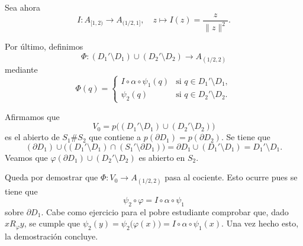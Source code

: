 {    Sea ahora 
    \[
    I : A_{[1, 2)} \to A_{(1/2, 1]},\quad z \mapsto I(z) = \frac{z}{\|z\|^2}.
    \]

    Por último, definimos 
    \[
    \Phi : (D_1' \setminus D_1) \cup (D_2' \setminus D_2) \to A_{(1/2, 2)}
    \]
    mediante
    \[
    \Phi(q) = 
    \begin{cases}
    I \circ \alpha \circ \psi_1(q) & \text{si } q \in D_1' \setminus D_1, \\
    \psi_2(q) & \text{si } q \in D_2' \setminus D_2.
    \end{cases}
    \]

    Afirmamos que 
    \[
    V_0 = p\big((D_1' \setminus D_1) \cup (D_2' \setminus D_2)\big)
    \]
    es el abierto de \(S_1 \# S_2\) que contiene a \(p(\partial D_1) = p(\partial D_2)\). Se tiene que 
    \[
    (\partial D_1)\cup \big((D_1' \setminus D_1) \cap (S_1' \setminus \partial D_1)\big) = \partial D_1 \cup (D_1' \setminus D_1) = D_1'\setminus D_1.
    \]
    Veamos que \(\varphi(\partial D_1) \cup (D_2'\setminus D_2) \) es abierto en \(S_2\).

    Queda por demostrar que 
    \(\Phi : V_0 \to A_{(1/2, 2)}\) pasa al cociente. Esto ocurre pues se tiene que 
    \[
    \psi_2 \circ \varphi = I \circ \alpha \circ \psi_1
    \]
    sobre \(\partial D_1\). Cabe como ejercicio para el pobre estudiante comprobar que, dado \(x R_\varphi y\), se cumple que \(\psi_2(y) = \psi_2\big(\varphi(x)\big) = I \circ \alpha \circ \psi_1(x)\). Una vez hecho esto, la demostración concluye.  
}